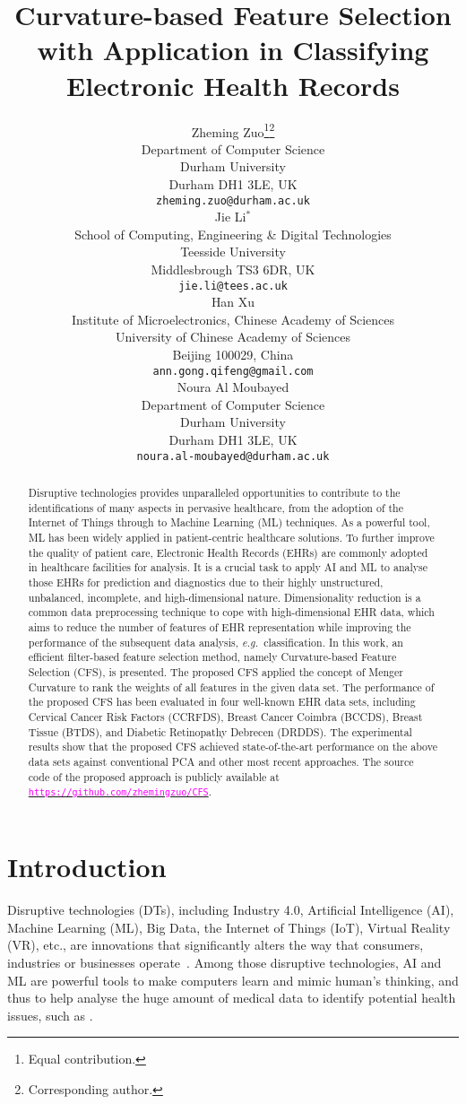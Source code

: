 \documentclass{article}
\title{Curvature-based Feature Selection with Application in Classifying Electronic Health Records}
\author{
    Zheming Zuo\thanks{Equal contribution.}\hspace{0.15cm}\thanks{Corresponding author.}\\
Department of Computer Science\\
  Durham University\\
  Durham DH1 3LE, UK\\
  \texttt{zheming.zuo@durham.ac.uk} \\
\And
 Jie Li$^{*}$ \\
  School of Computing, Engineering \& Digital Technologies\\
  Teesside University\\
  Middlesbrough TS3 6DR, UK\\
  \texttt{jie.li@tees.ac.uk} \\
  \And
 Han Xu \\
  Institute of Microelectronics, Chinese Academy of Sciences\\
  University of Chinese Academy of Sciences\\
  Beijing 100029, China\\
  \texttt{ann.gong.qifeng@gmail.com} \\
  \And
  Noura Al Moubayed\\
Department of Computer Science\\
  Durham University\\
  Durham DH1 3LE, UK\\
  \texttt{noura.al-moubayed@durham.ac.uk} \\
}
\newcommand{\zzeg}{\emph{e.g.}~}
\newcommand*{\1}{\textcolor{magenta}}
\begin{document}
\maketitle
\begin{abstract}
Disruptive technologies provides unparalleled opportunities to contribute to the identifications of many aspects in pervasive healthcare, from the adoption of the Internet of Things through to Machine Learning (ML) techniques. As a powerful tool, ML has been widely applied in patient-centric healthcare solutions. To further improve the quality of patient care, Electronic Health Records (EHRs) are commonly adopted in healthcare facilities for analysis. It is a crucial task to apply AI and ML to analyse those EHRs for prediction and diagnostics due to their highly unstructured, unbalanced, incomplete, and high-dimensional nature. Dimensionality reduction is a common data preprocessing technique to cope with high-dimensional EHR data, which aims to reduce the number of features of EHR representation while improving the performance of the subsequent data analysis, \zzeg classification. In this work, an efficient filter-based feature selection method, namely Curvature-based Feature Selection (CFS), is presented. The proposed CFS applied the concept of Menger Curvature to rank the weights of all features in the given data set. The performance of the proposed CFS has been evaluated in four well-known EHR data sets, including Cervical Cancer Risk Factors (CCRFDS), Breast Cancer Coimbra (BCCDS), Breast Tissue (BTDS), and Diabetic Retinopathy Debrecen (DRDDS). The experimental results show that the proposed CFS achieved state-of-the-art performance on the above data sets against conventional PCA and other most recent approaches. The source code of the proposed approach is publicly available at \href{https://github.com/zhemingzuo/CFS}{\texttt{\1{https://github.com/zhemingzuo/CFS}}}.
\end{abstract}




	\section{Introduction}
    Disruptive technologies (DTs), including Industry 4.0, Artificial Intelligence (AI), Machine Learning (ML), Big Data, the Internet of Things (IoT), Virtual Reality (VR), etc., are innovations that significantly alters the way that consumers, industries or businesses operate~\cite{abdel2020intelligent}. Among those disruptive technologies, AI and ML are powerful tools to make computers learn and mimic human's thinking, and thus to help analyse the huge amount of medical data to identify potential health issues, such as \cite{chang2018computational, chang2018data}. 
	
\end{document}
